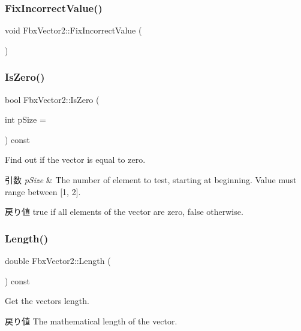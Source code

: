 \subsubsection{\texorpdfstring{Fix\+Incorrect\+Value()}{FixIncorrectValue()}}
{\footnotesize\ttfamily void Fbx\+Vector2\+::\+Fix\+Incorrect\+Value (\begin{DoxyParamCaption}{ }\end{DoxyParamCaption})}

\mbox{\label{class_fbx_vector2_ae98104ed051bcace69d39d459c39bae4}} 
\subsubsection{\texorpdfstring{Is\+Zero()}{IsZero()}}
{\footnotesize\ttfamily bool Fbx\+Vector2\+::\+Is\+Zero (\begin{DoxyParamCaption}\item[{int}]{p\+Size = {} }\end{DoxyParamCaption}) const}

Find out if the vector is equal to zero. 
\begin{DoxyParams}{引数}
{\em p\+Size} & The number of element to test, starting at beginning. Value must range between \mbox{[}1, 2\mbox{]}. \\
\hline
\end{DoxyParams}
\begin{DoxyReturn}{戻り値}
{\ttfamily true} if all elements of the vector are zero, {\ttfamily false} otherwise. 
\end{DoxyReturn}
\mbox{\label{class_fbx_vector2_ad49dcb1601d78cee3d50509f5b08ecd4}} 
\subsubsection{\texorpdfstring{Length()}{Length()}}
{\footnotesize\ttfamily double Fbx\+Vector2\+::\+Length (\begin{DoxyParamCaption}{ }\end{DoxyParamCaption}) const}

Get the vector\textquotesingle{}s length. \begin{DoxyReturn}{戻り値}
The mathematical length of the vector. 
\end{DoxyReturn}
\mbox{\label{class_fbx_vector2_a40ac8ab130c716a8ecf30634a168751f}} 
